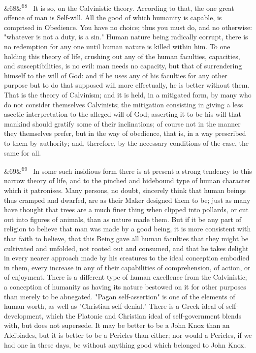 \documentclass[12pt]{article}
\newcommand{\para}[1][]{\par\noindent\ifx&#1&\else\textsuperscript{\footnotesize #1}~\fi}
\begin{document}
\para[68] It is so, on the Calvinistic theory. According to that, the one great offence of man is Self-will. All the good of which humanity is capable, is comprised in Obedience. You have no choice; thus you must do, and no otherwise: "whatever is not a duty, is a sin." Human nature being radically corrupt, there is no redemption for any one until human nature is killed within him. To one holding this theory of life, crushing out any of the human faculties, capacities, and susceptibilities, is no evil: man needs no capacity, but that of surrendering himself to the will of God: and if he uses any of his faculties for any other purpose but to do that supposed will more effectually, he is better without them. That is the theory of Calvinism; and it is held, in a mitigated form, by many who do not consider themselves Calvinists; the mitigation consisting in giving a less ascetic interpretation to the alleged will of God; asserting it to be his will that mankind should gratify some of their inclinations; of course not in the manner they themselves prefer, but in the way of obedience, that is, in a way prescribed to them by authority; and, therefore, by the necessary conditions of the case, the same for all.

\para[69] In some such insidious form there is at present a strong tendency to this narrow theory of life, and to the pinched and hidebound type of human character which it patronises. Many persons, no doubt, sincerely think that human beings thus cramped and dwarfed, are as their Maker designed them to be; just as many have thought that trees are a much finer thing when clipped into pollards, or cut out into figures of animals, than as nature made them. But if it be any part of religion to believe that man was made by a good being, it is more consistent with that faith to believe, that this Being gave all human faculties that they might be cultivated and unfolded, not rooted out and consumed, and that he takes delight in every nearer approach made by his creatures to the ideal conception embodied in them, every increase in any of their capabilities of comprehension, of action, or of enjoyment. There is a different type of human excellence from the Calvinistic; a conception of humanity as having its nature bestowed on it for other purposes than merely to be abnegated. "Pagan self-assertion" is one of the elements of human worth, as well as "Christian self-denial." There is a Greek ideal of self-development, which the Platonic and Christian ideal of self-government blends with, but does not supersede. It may be better to be a John Knox than an Alcibiades, but it is better to be a Pericles than either; nor would a Pericles, if we had one in these days, be without anything good which belonged to John Knox.
\end{document}
